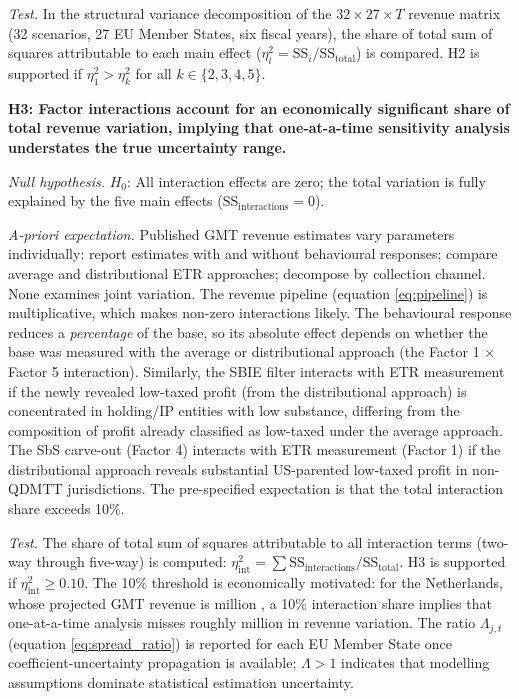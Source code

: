 \documentclass[11pt,a4paper]{article}
\newcommand{\EUR}{\texteuro}
\begin{document}
\textit{Test.} In the structural variance decomposition of the $32 \times 27 \times T$ revenue matrix (32 scenarios, 27 EU Member States, six fiscal years), the share of total sum of squares attributable to each main effect ($\eta_i^2 = \text{SS}_i / \text{SS}_{\text{total}}$) is compared. H2 is supported if $\eta_1^2 > \eta_k^2$ for all $k \in \{2, 3, 4, 5\}$.

\textbf{H3: Factor interactions account for an economically significant share of total revenue variation, implying that one-at-a-time sensitivity analysis understates the true uncertainty range.}

\textit{Null hypothesis.} $H_0$: All interaction effects are zero; the total variation is fully explained by the five main effects ($\text{SS}_{\text{interactions}} = 0$).

\textit{A-priori expectation.} Published GMT revenue estimates vary parameters individually: \citet{barake2022} report estimates with and without behavioural responses; \citet{hugger2026} compare average and distributional ETR approaches; \citet{boukal2026} decompose by collection channel. None examines joint variation. The revenue pipeline (equation \ref{eq:pipeline}) is multiplicative, which makes non-zero interactions likely. The behavioural response reduces a \emph{percentage} of the base, so its absolute effect depends on whether the base was measured with the average or distributional approach (the Factor 1 $\times$ Factor 5 interaction). Similarly, the SBIE filter interacts with ETR measurement if the newly revealed low-taxed profit (from the distributional approach) is concentrated in holding/IP entities with low substance, differing from the composition of profit already classified as low-taxed under the average approach. The SbS carve-out (Factor 4) interacts with ETR measurement (Factor 1) if the distributional approach reveals substantial US-parented low-taxed profit in non-QDMTT jurisdictions. The pre-specified expectation is that the total interaction share exceeds 10\%.

\textit{Test.} The share of total sum of squares attributable to all interaction terms (two-way through five-way) is computed: $\eta_{\text{int}}^2 = \sum \text{SS}_{\text{interactions}} / \text{SS}_{\text{total}}$. H3 is supported if $\eta_{\text{int}}^2 \geq 0.10$. The 10\% threshold is economically motivated: for the Netherlands, whose projected GMT revenue is \EUR466 million \citep{36369_3}, a 10\% interaction share implies that one-at-a-time analysis misses roughly \EUR47 million in revenue variation. The ratio $\Lambda_{j,t}$ (equation \ref{eq:spread_ratio}) is reported for each EU Member State once coefficient-uncertainty propagation is available; $\Lambda > 1$ indicates that modelling assumptions dominate statistical estimation uncertainty.
\end{document}
